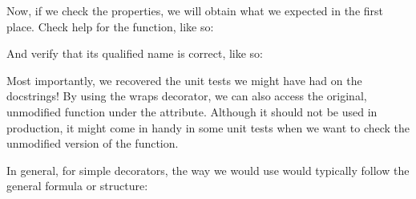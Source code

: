 \documentclass[a4paper,10pt,english]{sphinxmanual}
\begin{document}
Now, if we check the properties, we will obtain what we expected in the first place.
Check help for the function, like so:

\begin{sphinxVerbatim}[commandchars=\\\{\}]
      
\end{sphinxVerbatim}

And verify that its qualified name is correct, like so:

\begin{sphinxVerbatim}[commandchars=\\\{\}]
\end{sphinxVerbatim}

Most importantly, we recovered the unit tests we might have had on the docstrings! By
using the wraps decorator, we can also access the original, unmodified function under the
 attribute. Although it should not be used in production, it might come in
handy in some unit tests when we want to check the unmodified version of the function.

In general, for simple decorators, the way we would use  would
typically follow the general formula or structure:

\begin{sphinxVerbatim}[commandchars=\\\{\}]
 
      
          

 
\end{sphinxVerbatim}
\end{document}
